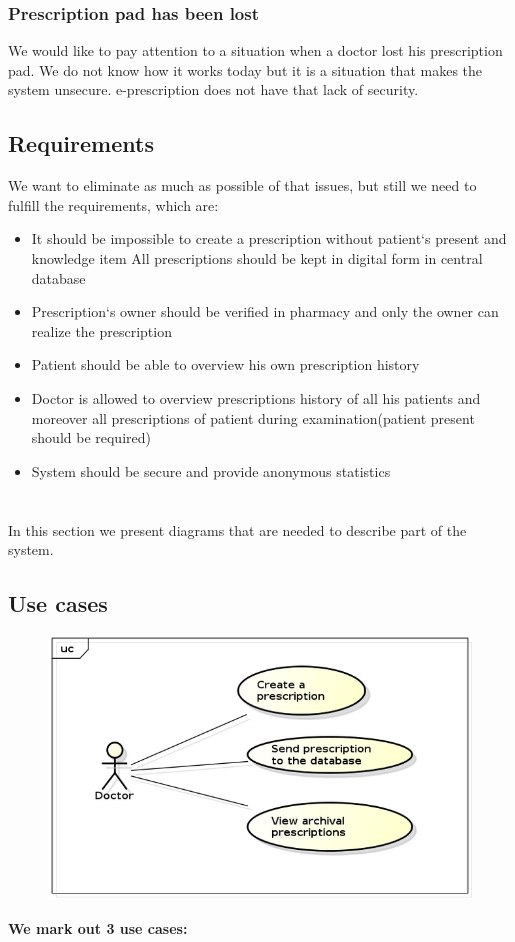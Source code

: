 \subsection{Prescription pad has been lost}
We would like to pay attention to a situation when a doctor lost his prescription pad. We do not know how it works today but it is a situation that makes the system unsecure. e-prescription does not have that lack of security. 

\section{Requirements}
We want to eliminate as much as possible of that issues, but still we need to fulfill the requirements, which are:\\
\begin{itemize}
\item It should be impossible to create a prescription without patient`s present and knowledge
item All prescriptions should be kept in digital form in central database
\item Prescription`s owner should be verified in pharmacy and only the owner can realize the prescription
\item Patient should be able to overview his own prescription history
\item Doctor is allowed to overview prescriptions history of all his patients and moreover all prescriptions of patient during examination(patient present should be required) 
\item System should be secure and provide anonymous statistics

\end{itemize}

\newpage
\chapter {}
In this section we present diagrams that are needed to describe part of the system.
\section{Use cases}
\begin{figure}[h]
\centering
\includegraphics[width=1\textwidth]{doctor/UseCases.png}
\end{figure} 
\textbf{We mark out 3 use cases:}

